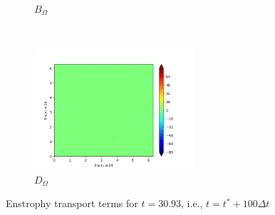 \begin{figure}[H]
\begin{subfigure}{0.45\textwidth}
        \caption{$B_{\Omega}$}
    \end{subfigure}
    ~
    \begin{subfigure}{0.45\textwidth}
        \includegraphics[height=1.75in]{media/run-cds-65/D-enst-1440.png}
        \caption{$D_{\Omega}$}
    \end{subfigure}
    \caption{Enstrophy transport terms for $t=30.93$, i.e., $t=t^{\ast} + 100 \Delta t$}
\end{figure}

\newpage

